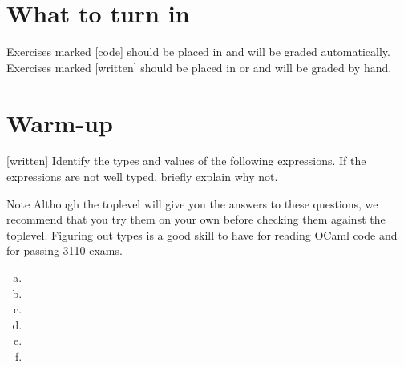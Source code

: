 \documentclass{pset}
\begin{document}
\section*{What to turn in}

Exercises marked [code] should be placed in  and will
be graded automatically. Exercises marked [written] should be placed
in  or  and will be graded
by hand.

\newpage{}
\section*{Warm-up}

\exercise{} 
[written] Identify the types and values of the following expressions.
If the expressions are not well typed, briefly explain why not.

\begin{note}{Note}
Although the toplevel will give you the answers to these questions, we
recommend that you try them on your own before checking them against the
toplevel.  Figuring out types is a good skill to have for reading OCaml code
and for passing 3110 exams.
\end{note}

\begin{multicols}{2}
\begin{enumerate}[(a)]
\item{} 
\item{} 
\item{} \code{["zardoz"; 3+5]}
\columnbreak{}
\item{} \code{[List.hd] :: []}
\item{} 
\item{} 
\end{enumerate}
\end{multicols}
\end{document}
